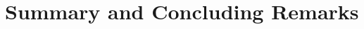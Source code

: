\documentclass[12pt,a4paper]{article}
\begin{document}
{\section{Summary and Concluding Remarks}
\clearpage


\setcounter{page}{\thesavepage}
\pagestyle{plain}


\clearpage

\appendix
}
\end{document}

